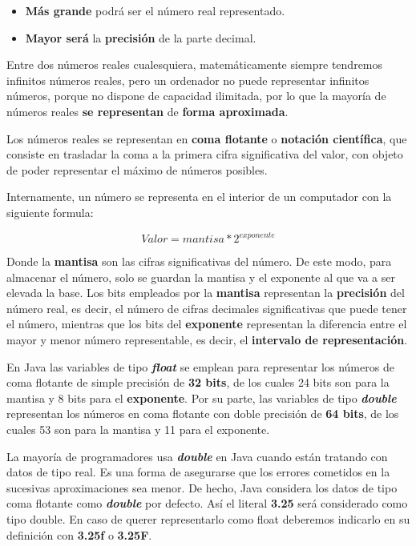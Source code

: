 \begin{itemize}
    \item \textbf{Más grande} podrá ser el número real representado.
    \item \textbf{Mayor será} la \textbf{precisión} de la parte decimal.
\end{itemize}

Entre dos números reales cualesquiera, matemáticamente siempre tendremos infinitos números reales, pero un ordenador no puede representar infinitos números, porque no dispone de capacidad ilimitada, por lo que la mayoría de números reales \textbf{se representan} de \textbf{forma aproximada}.

Los números reales se representan en \textbf{coma flotante} o \textbf{notación científica}, que consiste en trasladar la coma a la primera cifra significativa del valor, con objeto de poder representar el máximo de números posibles.

Internamente, un número se representa en el interior de un computador con la siguiente formula:

\begin{equation*}\label{key}
    Valor = mantisa*2^{exponente}
\end{equation*}

Donde la \textbf{mantisa} son las cifras significativas del número. De este modo, para almacenar el número, solo se guardan la mantisa y el exponente al que va a ser elevada la base. Los bits empleados por la \textbf{mantisa} representan la \textbf{precisión} del número real, es decir, el número de cifras decimales significativas que puede tener el número, mientras que los bits del \textbf{exponente} representan la diferencia entre el mayor y menor número representable, es decir, el \textbf{intervalo de representación}.

En Java las variables de tipo \textbf{\textit{float}} se emplean para representar los números de coma flotante de simple precisión de \textbf{32 bits}, de los cuales 24 bits son para la mantisa y 8 bits para el \textbf{exponente}. Por su parte, las variables de tipo \textbf{\textit{double}} representan los números en coma flotante con doble precisión de \textbf{64 bits}, de los cuales 53 son para la mantisa y 11 para el exponente.

La mayoría de programadores usa \textbf{\textit{double}} en Java cuando están tratando con datos de tipo real. Es una forma de asegurarse que los errores cometidos en la sucesivas aproximaciones sea menor. De hecho, Java considera los datos de tipo coma flotante como \textbf{\textit{double}} por defecto. Así el literal \textbf{3.25} será considerado como tipo double. En caso de querer representarlo como float deberemos indicarlo en su definición con \textbf{3.25f} o \textbf{3.25F}.

